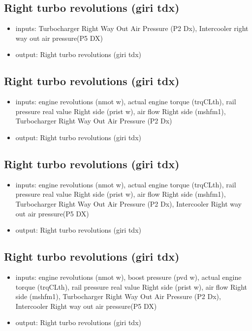 \subsection{Right turbo revolutions (giri tdx)}
\begin{itemize}
	\item{inputs: Turbocharger Right Way Out Air Pressure (P2 Dx), Intercooler right way out air pressure(P5 DX)}
	\item{output: Right turbo revolutions (giri tdx)}
\end{itemize}	




\subsection{Right turbo revolutions (giri tdx)}
\begin{itemize}
	\item{inputs: engine revolutions (nmot w), actual engine torque (trqCLth), rail pressure real value Right side (prist w), air flow Right side (mshfm1), Turbocharger Right Way Out Air Pressure (P2 Dx)}
	\item{output: Right turbo revolutions (giri tdx)}
\end{itemize}	



\subsection{Right turbo revolutions (giri tdx)}
\begin{itemize}
	\item{inputs: engine revolutions (nmot w), actual engine torque (trqCLth), rail pressure real value Right side (prist w), air flow Right side (mshfm1), Turbocharger Right Way Out Air Pressure (P2 Dx), Intercooler Right way out air pressure(P5 DX)}
	\item{output: Right turbo revolutions (giri tdx)}
\end{itemize}	



\subsection{Right turbo revolutions (giri tdx)}
\begin{itemize}
	\item{inputs: engine revolutions (nmot w), boost pressure (pvd w), actual engine torque (trqCLth), rail pressure real value Right side (prist w), air flow Right side (mshfm1), Turbocharger Right Way Out Air Pressure (P2 Dx), Intercooler Right way out air pressure(P5 DX)}
	\item{output: Right turbo revolutions (giri tdx)}
\end{itemize}	

